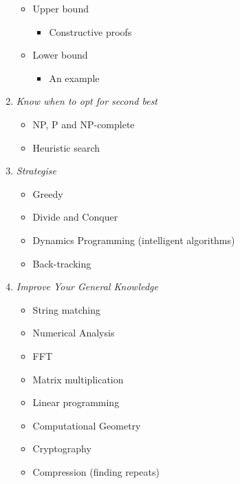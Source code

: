 \documentclass{article}
\begin{document}
\begin{enumerate}
\begin{itemize}
\begin{itemize}
    \end{itemize}
  \item Upper bound
    \begin{itemize}
    \item Constructive proofs
    \end{itemize}
  \item Lower bound
    \begin{itemize}
    \item An example
    \end{itemize}
  \end{itemize}
\item \emph{Know when to opt for second best}
  \begin{itemize}
  \item NP, P and NP-complete
  \item Heuristic search
  \end{itemize}
\item \emph{Strategise}
  \begin{itemize}
  \item Greedy
  \item Divide and Conquer
  \item Dynamics Programming (intelligent algorithms)
  \item Back-tracking 
  \end{itemize}
\item \emph{Improve Your General Knowledge}
  \begin{itemize}
  \item String matching
  \item Numerical Analysis
  \item FFT
  \item Matrix multiplication
  \item Linear programming
  \item Computational Geometry
  \item Cryptography
  \item Compression (finding repeats)
  \end{itemize}
\end{enumerate}
\end{document}
